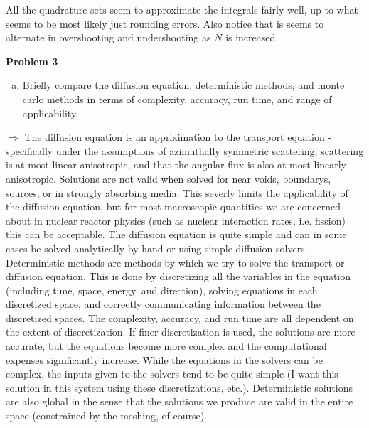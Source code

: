 \documentclass[10pt]{article}
\begin{document}
All the quadrature sets seem to approximate the integrals fairly well, up to what seems to be most likely just rounding errors. Also notice that is seems to alternate in overshooting and undershooting as $N$ is increased.






\newpage
\noindent \textbf{Problem 3}\\ [-4ex]
\begin{enumerate}[(a)]
    \item Briefly compare the diffusion equation, deterministic methods, and monte carlo methods in terms of complexity, accuracy, run time, and range of applicability. \\[-5pt]
\end{enumerate}

$\Rightarrow$ The diffusion equation is an appriximation to the transport equation - specifically under the assumptions of azimuthally symmetric scattering, scattering is at most linear anisotropic, and that the angular flux is also at most linearly anisotropic. Solutions are not valid when solved for near voids, boundarys, sources, or in strongly absorbing media. This severly limits the applicability of the diffusion equation, but for most macroscopic quantities we are concerned about in nuclear reactor physics (such as nuclear interaction rates, i.e.\,\,fission) this can be acceptable. The diffusion equation is quite simple and can in some cases be solved analytically by hand or using simple diffusion solvers.\\

Deterministic methods are methods by which we try to solve the transport or diffusion equation. This is done by discretizing all the variables in the equation (including time, space, energy, and direction), solving equations in each discretized space, and correctly communicating information between the discretized spaces. The complexity, accuracy, and run time are all dependent on the extent of discretization. If finer discretization is used, the solutions are more accurate, but the equations become more complex and the computational expenses significantly increase. While the equations in the solvers can be complex, the inputs given to the solvers tend to be quite simple (I want this solution in this system using these discretizations, etc.). Deterministic solutions are also global in the sense that the solutions we produce are valid in the entire space (constrained by the meshing, of course). \\
\end{document}
